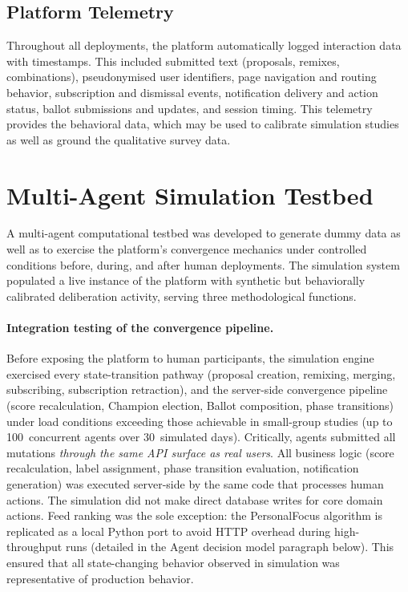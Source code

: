\documentclass[a4paper, 12pt, twoside]{iviathesis}
\begin{document}
\subsection{Platform Telemetry}
\label{sec:telemetry}
Throughout all deployments, the platform automatically logged interaction data with timestamps. This included submitted text (proposals, remixes, combinations), pseudonymised user identifiers, page navigation and routing behavior, subscription and dismissal events, notification delivery and action status, ballot submissions and updates, and session timing. This telemetry provides the behavioral data, which may be used to calibrate simulation studies as well as ground the qualitative survey data.

\section{Multi-Agent Simulation Testbed}
\label{sec:method-c}
A multi-agent computational testbed was developed to generate dummy data as well as to exercise the platform's convergence mechanics under controlled conditions before, during, and after human deployments. The simulation system populated a live instance of the platform with synthetic but behaviorally calibrated deliberation activity, serving three methodological functions.

\paragraph{Integration testing of the convergence pipeline.}
Before exposing the platform to human participants, the simulation engine exercised every state-transition pathway (proposal creation, remixing, merging, subscribing, subscription retraction), and the server-side convergence pipeline (score recalculation, Champion election, Ballot composition, phase transitions) under load conditions exceeding those achievable in small-group studies (up to 100~concurrent agents over 30~simulated days). Critically, agents submitted all mutations \textit{through the same API surface as real users}. All business logic (score recalculation, label assignment, phase transition evaluation, notification generation) was executed server-side by the same code that processes human actions. The simulation did not make direct database writes for core domain actions. Feed ranking was the sole exception: the PersonalFocus algorithm is replicated as a local Python port to avoid HTTP overhead during high-throughput runs (detailed in the Agent decision model paragraph below). This ensured that all state-changing behavior observed in simulation was representative of production behavior.
\end{document}
